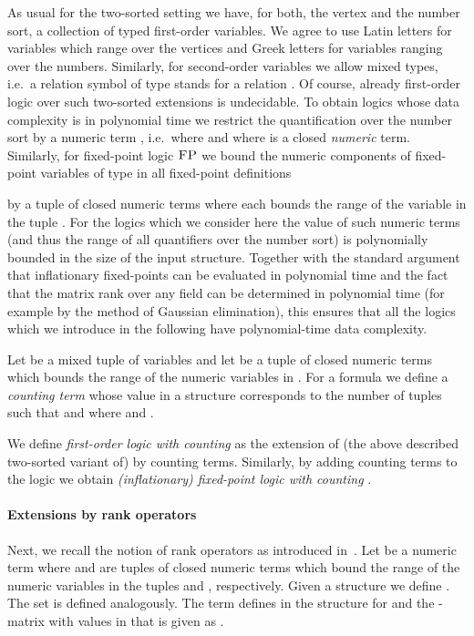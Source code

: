 \documentclass[a4paper,UKenglish]{lipics}
\newcommand{\logic}[1]{\ensuremath{\textsc{#1}}\xspace}
\newcommand{\FP}{\logic{FP}}
\theoremstyle{plain}
\begin{document}
As usual for the two-sorted setting we have,
for both, the vertex and the number sort, a collection of typed
first-order variables. We agree to use Latin letters 
for variables which range over the vertices and Greek letters  for variables ranging over the numbers. 
Similarly, for second-order variables  we allow mixed types, i.e.\ a 
relation symbol  of type  stands for a relation 
. Of course, already first-order logic over 
such 
two-sorted extensions is undecidable. To obtain logics whose 
data complexity is in polynomial time we restrict the quantification over the 
number sort by a numeric term , i.e.\  where  and where  is a closed \emph{numeric} term.
Similarly, for fixed-point logic \FP we bound the numeric components of 
fixed-point variables  of type  in all fixed-point definitions 

by a tuple of closed numeric terms  where each 
 bounds the range of the variable  in the tuple . 
For the logics which we consider here the value of such 
numeric terms (and thus the range of all quantifiers over the number sort) 
is polynomially bounded in the size of the input structure. Together 
with the standard argument that inflationary fixed-points can be evaluated in 
polynomial time and the fact that the matrix rank over any field can be 
determined in polynomial time (for example by the method of Gaussian 
elimination), this ensures that all the logics which we introduce in the 
following have polynomial-time data complexity.


Let  be a mixed tuple of variables and let  be a tuple of 
closed numeric terms which bounds the range of the numeric variables in .
For a formula  we define a \emph{counting term}  whose value  in a structure  
corresponds to the number of tuples 
 such that  
and   where  and .

We define \emph{first-order logic with counting } as the extension of 
(the above described two-sorted variant of)  by counting terms. 
Similarly, by adding counting terms to the logic  we obtain
\emph{(inflationary) fixed-point logic with counting }.


\paragraph*{Extensions by rank operators}

Next, we recall the notion of rank operators as introduced 
in~\cite{DaGrHoLa09}. 
Let  be a numeric 
term where  and  are tuples of closed numeric terms which bound 
the 
range of the numeric variables in the tuples  and , respectively. 
Given a structure  we define . 
The set  is defined 
analogously. The term  defines in the structure  
for  and 
the -matrix  with values in  that is given
as .
\end{document}
